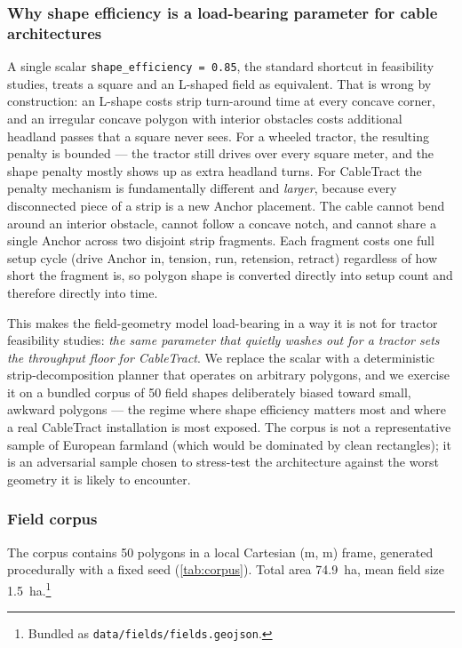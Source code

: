 \documentclass[11pt,a4paper]{article}
\begin{document}
\subsubsection{Why shape efficiency is a load-bearing parameter for cable architectures}

A single scalar \texttt{shape\_efficiency = 0.85}, the standard shortcut in feasibility studies, treats a square and an L-shaped field as equivalent. That is wrong by construction: an L-shape costs strip turn-around time at every concave corner, and an irregular concave polygon with interior obstacles costs additional headland passes that a square never sees. For a wheeled tractor, the resulting penalty is bounded --- the tractor still drives over every square meter, and the shape penalty mostly shows up as extra headland turns. For CableTract the penalty mechanism is fundamentally different and \emph{larger}, because every disconnected piece of a strip is a new Anchor placement. The cable cannot bend around an interior obstacle, cannot follow a concave notch, and cannot share a single Anchor across two disjoint strip fragments. Each fragment costs one full setup cycle (drive Anchor in, tension, run, retension, retract) regardless of how short the fragment is, so polygon shape is converted directly into setup count and therefore directly into time.

This makes the field-geometry model load-bearing in a way it is not for tractor feasibility studies: \emph{the same parameter that quietly washes out for a tractor sets the throughput floor for CableTract}. We replace the scalar with a deterministic strip-decomposition planner that operates on arbitrary polygons, and we exercise it on a bundled corpus of 50 field shapes deliberately biased toward small, awkward polygons --- the regime where shape efficiency matters most and where a real CableTract installation is most exposed. The corpus is not a representative sample of European farmland (which would be dominated by clean rectangles); it is an adversarial sample chosen to stress-test the architecture against the worst geometry it is likely to encounter.

\subsubsection{Field corpus}\label{sec:corpus}

The corpus contains 50 polygons in a local Cartesian (m, m) frame, generated procedurally with a fixed seed (\cref{tab:corpus}). Total area \SI{74.9}{\hectare}, mean field size \SI{1.5}{\hectare}.\footnote{Bundled as \texttt{data/fields/fields.geojson}.}
\end{document}
